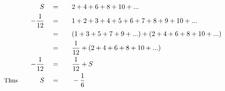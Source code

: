 \begin{alignat*}{5}
&\,&S\quad&=\quad&&2+4+6+8+10+...\\
&\,&-\frac{1}{12}\quad&=&&1+2+3+4+5+6+7+8+9+10+...\\
&\,&\,&=&&(1+3+5+7+9+...)+(2+4+6+8+10+...)\\
&\,&\,&=&&\frac{1}{12}+(2+4+6+8+10+...)\\
&\,&-\frac{1}{12}\quad&=&&\frac{1}{12}+S\\
&\,\small\text{Thus}\quad&S\quad&=&&-\frac{1}{6}
\end{alignat*}
